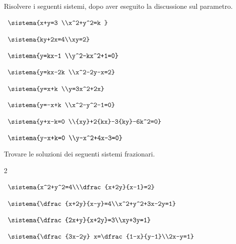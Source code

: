 \begin{esercizio}[*]
\label{ese:6.8}
Risolvere i seguenti sistemi, dopo aver eseguito la discussione sul 
parametro.
\begin{enumeratea}
\item~\(\sistema{x+y=3 \\x^2+y^2=k }\)
\item~\( \sistema{ky+2x=4\\xy=2}\)
\item~\( \sistema{y=kx-1 \\y^2-kx^2+1=0}\)
\item~\(\sistema{y=kx-2k \\x^2-2y-x=2}\)
\item~\(\sistema{y=x+k \\y=3x^2+2x}\)
\item~\( \sistema{y=-x+k \\x^2-y^2-1=0}\)
\item~\(\sistema{y+x-k=0 
\\{xy}+2{kx}-3{ky}-6k^2=0}\)
\item~\( \sistema{y-x+k=0 
\\y-x^2+4x-3=0}\)
\end{enumeratea}
\end{esercizio}

\begin{esercizio}[*]
\label{ese:6.10}
Trovare le soluzioni dei seguenti sistemi frazionari.
\begin{htmulticols}{2}
\begin{enumeratea}

\item~\(\sistema{x^2+y^2=4\\\dfrac{x+2y}{x-1}=2}\)



\item~\(\sistema{\dfrac{x+2y}{x-y}=4\\x^2+y^2+3x-2y=1}\)

\item~\(\sistema{\dfrac{2x+y}{x+2y}=3\\xy+3y=1}\)
\item~\(\sistema{\dfrac{3x-2y} 
x=\dfrac{1-x}{y-1}\\2x-y=1}\)
\end{enumeratea}
\end{htmulticols}
\end{esercizio}

